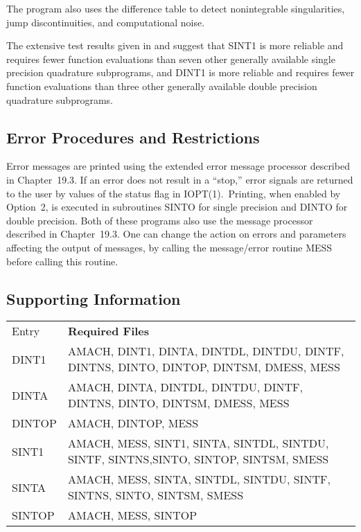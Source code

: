 \documentclass[twoside]{MATH77}
\begin{document}
The program also uses the difference table to detect nonintegrable
singularities, jump discontinuities, and computational noise.

The extensive test results given in \cite{Krogh:1974:PTR} and
\cite{Krogh:1977:TRQI} suggest that SINT1 is more reliable and requires
fewer function evaluations than seven other generally available single
precision quadrature subprograms, and DINT1 is more reliable and requires
fewer function evaluations than three other generally available double
precision quadrature subprograms.




\subsection{Error Procedures and Restrictions}

Error messages are printed using the extended error message processor
described in Chapter~19.3. If an error does not result in a ``stop,'' error
signals are returned to the user by values of the status flag in IOPT(1).\
Printing, when enabled by Option~2, is executed in subroutines SINTO for
single precision and DINTO for double precision. Both of these programs also
use the message processor described in Chapter~19.3. One can change the
action on errors and parameters affecting the output of messages, by calling
the message/error routine MESS before calling this routine.

\subsection{Supporting Information}

\begin{tabular}{@{\bf}l@{\hspace{5pt}}l}
Entry & \hspace{.35in} {\bf Required Files}\vspace{2pt} \\
DINT1 & \parbox[t]{2.7in}{ \raggedright
      AMACH, DINT1, DINTA, DINTDL, DINTDU, DINTF, DINTNS, DINTO, DINTOP,
 DINTSM, DMESS, MESS\rule[-5pt]{0pt}{8pt}}\\
DINTA & \parbox[t]{2.7in}{ \raggedright
      AMACH, DINTA, DINTDL, DINTDU, DINTF, DINTNS, DINTO, DINTSM, DMESS,
 MESS\rule[-5pt]{0pt}{8pt}}\\
DINTOP & \parbox[t]{2.7in}{ \raggedright
      AMACH, DINTOP, MESS\rule[-5pt]{0pt}{8pt}}\\
SINT1 & \parbox[t]{2.7in}{ \raggedright
      AMACH, MESS, SINT1, SINTA, SINTDL, SINTDU, SINTF, SINTNS,SINTO, SINTOP,
 SINTSM, SMESS\rule[-5pt]{0pt}{8pt}}\\
SINTA & \parbox[t]{2.7in}{ \raggedright
      AMACH, MESS, SINTA, SINTDL, SINTDU, SINTF, SINTNS, SINTO, SINTSM,
 SMESS\rule[-5pt]{0pt}{8pt}}\\
SINTOP & \parbox[t]{2.7in}{ \raggedright
      AMACH, MESS, SINTOP\rule[-5pt]{0pt}{8pt}}\\
\end{tabular}
\end{document}
